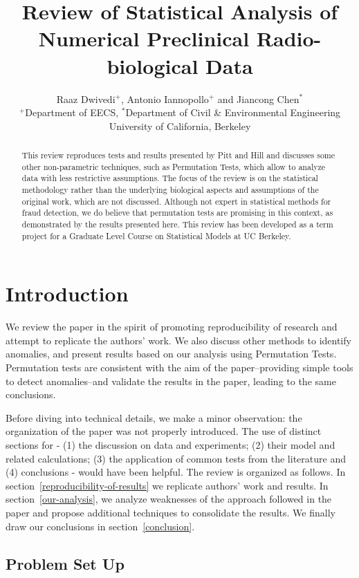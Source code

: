 \documentclass{article}
\title{Review of Statistical Analysis of Numerical Preclinical Radio-biological Data}
\author{Raaz Dwivedi$^+$,  Antonio Iannopollo$^+$ and Jiancong Chen$^*$ \\
    $^+$Department of EECS, $^*$Department of Civil \& Environmental Engineering \\
    University of California, Berkeley}
\begin{document}
    \maketitle



\begin{abstract}
This review reproduces tests and results
presented by Pitt and Hill and discusses some other non-parametric techniques, such as Permutation Tests, which allow to analyze data with less restrictive assumptions.
The focus of the review is on the statistical methodology rather than the underlying biological aspects and assumptions of the original work, which are not discussed.
Although not expert in statistical methods for fraud detection, we do believe that permutation tests are promising in this context, as demonstrated by the results presented here.
This review has been developed as a term
project for a Graduate Level Course on Statistical Models at UC Berkeley.
\end{abstract}

\section{Introduction} %
\label{sec:introduction}


We review the paper in the spirit of promoting reproducibility of research and attempt to replicate the authors' work. We also discuss other methods to identify anomalies, and present results based on our analysis using Permutation Tests. Permutation tests are consistent with the aim of the paper--providing simple tools to detect anomalies--and validate the results in the paper, leading to the same conclusions.

Before diving into technical details, we make a minor observation: the organization of the paper was not properly introduced. The use of distinct sections for - (1) the discussion on data and experiments; (2) their model and related calculations; (3) the application of common tests from the literature and (4) conclusions - would have been helpful. The review is organized as follows. In section~\ref{reproducibility-of-results} we replicate authors' work and results.
In section~\ref{our-analysis}, we analyze weaknesses of the approach followed in the paper and propose additional techniques to consolidate the results.
We finally draw our conclusions in section~\ref{conclusion}.


\subsection{Problem Set Up}\label{problem-set-up}
\end{document}
